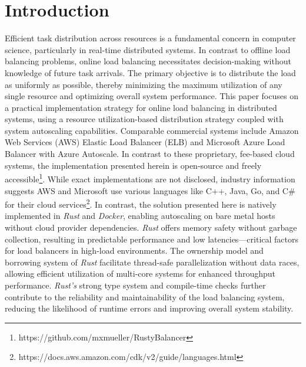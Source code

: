 \documentclass[twocolumn]{webofc}
\begin{document}
    \section{Introduction}
    Efficient task distribution across resources is a fundamental concern in computer science, particularly in real-time distributed systems. In contrast to offline load balancing problems, online load balancing necessitates decision-making without knowledge of future task arrivals. The primary objective is to distribute the load as uniformly as possible, thereby minimizing the maximum utilization of any single resource and optimizing overall system performance.
    This paper focuses on a practical implementation strategy for online load balancing in distributed systems, using a resource utilization-based distribution strategy coupled with system autoscaling capabilities. Comparable commercial systems include Amazon Web Services (AWS) Elastic Load Balancer (ELB)\cite{aws_load_balancing} and Microsoft Azure Load Balancer with Azure Autoscale\cite{azure_autoscale_overview}. In contrast to these proprietary, fee-based cloud systems, the implementation presented herein is open-source and freely accessible\footnote{https://github.com/mxmueller/RustyBalancer}. While exact implementations are not disclosed, industry information suggests AWS and Microsoft use various languages like C++, Java, Go, and C\# for their cloud services\footnote{https://docs.aws.amazon.com/cdk/v2/guide/languages.html}.
    In contrast, the solution presented here is natively implemented in \textit{Rust} and \textit{Docker}, enabling autoscaling on bare metal hosts without cloud provider dependencies. \textit{Rust} offers memory safety without garbage collection, resulting in predictable performance and low latencies—critical factors for load balancers in high-load environments. The ownership model and borrowing system of \textit{Rust} facilitate thread-safe parallelization without data races, allowing efficient utilization of multi-core systems for enhanced throughput performance. \textit{Rust's} strong type system and compile-time checks further contribute to the reliability and maintainability of the load balancing system, reducing the likelihood of runtime errors and improving overall system stability\cite{klabnik2019rust}.
\end{document}
